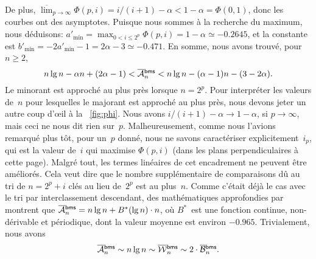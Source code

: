 De plus, \(\overline\lim_{p \to \infty}\Phi(p,i) = i/(i+1) - \alpha <
1 - \alpha = \Phi(0,1)\), donc les courbes ont des asymptotes. Puisque
nous sommes à la recherche du maximum, nous déduisons: \(a'_{\min} =
\max_{0 < i \leqslant 2^p}\Phi(p,i) = 1 - \alpha \simeq -0.2645\), et
la constante est \(b'_{\min} = -2a'_{\min} - 1 = 2\alpha - 3 \simeq
-0.471\). En somme, nous avons trouvé, pour \(n \geqslant 2\),
\begin{equation}
n\lg n - \alpha n + (2\alpha - 1) < \OM{\fun{bms}}{n}
< n\lg n - (\alpha - 1)n - (3 - 2\alpha).
\label{ineq:bounds_Mbms}
\end{equation}
Le minorant est approché au plus près lorsque \(n=2^p\). Pour
interpréter les valeurs de~\(n\) pour lesquelles le majorant est
approché au plus près, nous devons jeter un autre coup d'{\oe}il à la
\fig~\vref{fig:phi}. Nous avons \(i/(i+1) - \alpha \to 1 - \alpha\),
si \(p \to \infty\), mais ceci ne nous dit rien
sur~\(p\). Malheureusement, comme nous l'avions remarqué plus tôt,
pour un~\(p\) donné, nous ne savons caractériser
explicitement~\(i_p\), qui est la valeur de~\(i\) qui maximise
\(\Phi(p,i)\) (dans les plans perpendiculaires à cette page). Malgré
tout, les termes linéaires de cet encadrement ne peuvent être
améliorés. Cela veut dire que le nombre supplémentaire de comparaisons
dû au tri de \(n=2^p+i\) clés au lieu de~\(2^p\) est au
plus~\(n\). Comme c'était déjà le cas avec le tri par interclassement
descendant, des mathématiques approfondies par
\cite{PannyProdinger_1995} montrent que \(\OM{\fun{bms}}{n} = n\lg n +
B^*(\lg n) \cdot n\), où \(B^*\)~est
une fonction continue, non-dérivable et périodique, dont la valeur
moyenne est environ \(-0.965\). Trivialement, nous avons
\begin{equation*}
\OM{\fun{bms}}{n} \sim n\lg n \sim \OW{\fun{bms}}{n} \sim 2 \cdot
\OB{\fun{bms}}{n}.
\end{equation*}


